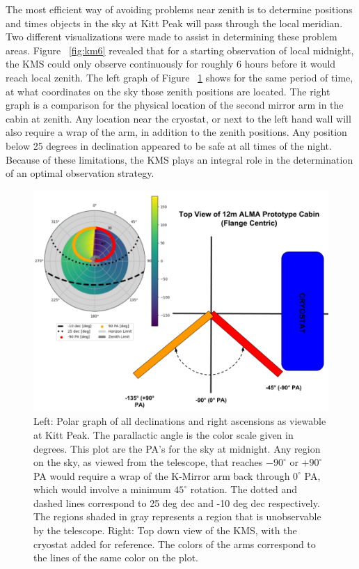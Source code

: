 \documentclass[manuscript]{aastex}
\begin{document}
The most efficient way of avoiding problems near zenith is to determine positions and times objects in the sky at Kitt Peak will pass through the local meridian. Two different visualizations were made to assist in determining these problem areas. Figure ~\ref{fig:km6} revealed that for a starting observation of local midnight, the KMS could only observe continuously for roughly 6 hours before it would reach local zenith. The left graph of Figure ~\ref{fig:km45} shows for the same period of time, at what coordinates on the sky those zenith positions are located. The right graph is a comparison for the physical location of the second mirror arm in the cabin at zenith. Any location near the cryostat, or next to the left hand wall will also require a wrap of the arm, in addition to the zenith positions. Any position below 25 degrees in declination appeared to be safe at all times of the night. Because of these limitations, the KMS plays an integral role in the determination of an optimal observation strategy.   

\begin{figure}[ht!]
	\centering
	\includegraphics[width=\textwidth]{km45.png}%
	\caption[Parallactic Angle Graphs to Determine Zenith Positions]{Left: Polar graph of all declinations and right ascensions as viewable at Kitt Peak. The parallactic angle is the color scale given in degrees. This plot are the PA's for the sky at midnight. Any region on the sky, as viewed from the telescope, that reaches $-90^{\circ}$ or $+90^{\circ}$ PA would require a wrap of the K-Mirror arm back through $0^{\circ}$ PA, which would involve a minimum $45^{\circ}$ rotation. The dotted and dashed lines correspond to 25 deg dec and -10 deg dec respectively. The regions shaded in gray represents a region that is unobservable by the telescope. Right: Top down view of the KMS, with the cryostat added for reference. The colors of the arms correspond to the lines of the same color on the plot.}%
	\label{fig:km45}%
\end{figure}
\end{document}
